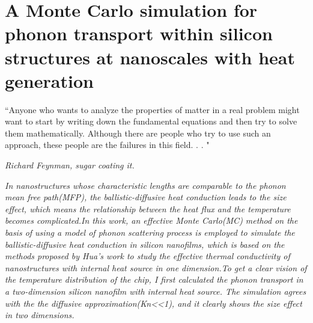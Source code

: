 
\chapter[MC Method]{A Monte Carlo simulation for phonon transport within silicon structures
at nanoscales with heat generation}

\graphicspath{{Chapter2/}}

\setlength{\epigraphwidth}{0.6\textwidth}
\epigraph{“Anyone who wants to analyze the properties of matter in a real problem
might want to start by writing down the fundamental equations and then
try to solve them mathematically. Although there are people who try to
use such an approach, these people are the failures in this field. . . "}
{\textit{Richard Feynman, sugar coating it.}}


\textit{In nanostructures whose characteristic lengths are comparable to the phonon mean free path(MFP), the ballistic-diffusive heat conduction leads to the size effect\cite{hua0}, which means the relationship between the heat flux and the temperature becomes complicated.In this work, an effective Monte Carlo(MC) method on the basis of using a model of phonon scattering process is employed to simulate the ballistic-diffusive heat conduction in silicon nanofilms, which is based on the methods proposed by Hua's work to study the effective thermal conductivity of nanostructures with internal heat source in one dimension\cite{hua0,hua1}.To get a clear vision of the temperature distribution of the chip, I first calculated the phonon transport in a two-dimension silicon nanofilm with internal heat source. The simulation agrees with the the diffusive approximation(Kn<<1), and it clearly shows the size effect in two dimensions.}                
 

